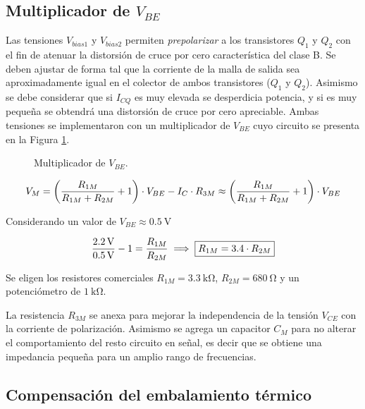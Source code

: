 \subsection{Multiplicador de $V_{BE}$}

	Las tensiones $V_{bias1}$ y $V_{bias2}$ permiten \textit{prepolarizar} a los transistores $Q_1$ y $Q_2$ con el fin de atenuar la distorsión de cruce por cero característica del clase B. Se deben ajustar de forma tal que la corriente de la malla de salida sea aproximadamente igual en el colector de ambos transistores ($Q_1$ y $Q_2$). Asimismo se debe considerar que si $I_{CQ}$ es muy elevada se desperdicia potencia, y si es muy pequeña se obtendrá una distorsión de cruce por cero apreciable. Ambas tensiones se implementaron con un multiplicador de $V_{BE}$ cuyo circuito se presenta en la Figura \ref{fig.multiplicador}.

	\begin{figure}[H]
		\centering
		\scalebox{0.5}{}
		\caption{Multiplicador de $V_{BE}$.}
		\label{fig.multiplicador}
	\end{figure}


	\begin{equation}
		\centering
		V_M = \left( \frac{R_{1M}}{R_{1M} + R_{2M}} +1 \right) \cdot V_{BE} - I_C \cdot R_{3M} \approx  \left( \frac{R_{1M}}{R_{1M} + R_{2M}} +1 \right) \cdot V_{BE}
	\end{equation}

	 Considerando un valor de $V_{BE} \approx \SI{0.5}{\volt}$

	 \begin{equation}
	 	\centering
		\frac{\SI{2.2}{\volt}}{\SI{0.5}{\volt}} -1 = \frac{R_{1M}}{R_{2M}} \implies \boxed{R_{1M} = \num{3,4} \cdot R_{2M}}
	\end{equation}

	Se eligen los resistores comerciales $R_{1M} = \SI{3.3}{\kilo\ohm}$, $R_{2M} = \SI{680}{\ohm}$ y un potenciómetro de $\SI{1}{\kilo\ohm}$. 

	La resistencia $R_{3M}$ se anexa para mejorar la independencia de la tensión $V_{CE}$ con la corriente de polarización. Asimismo se agrega un capacitor $C_M$ para no alterar el comportamiento del resto circuito en señal, es decir que se obtiene una impedancia pequeña para un amplio rango de frecuencias. 
	
\subsection{Compensación del embalamiento térmico}

